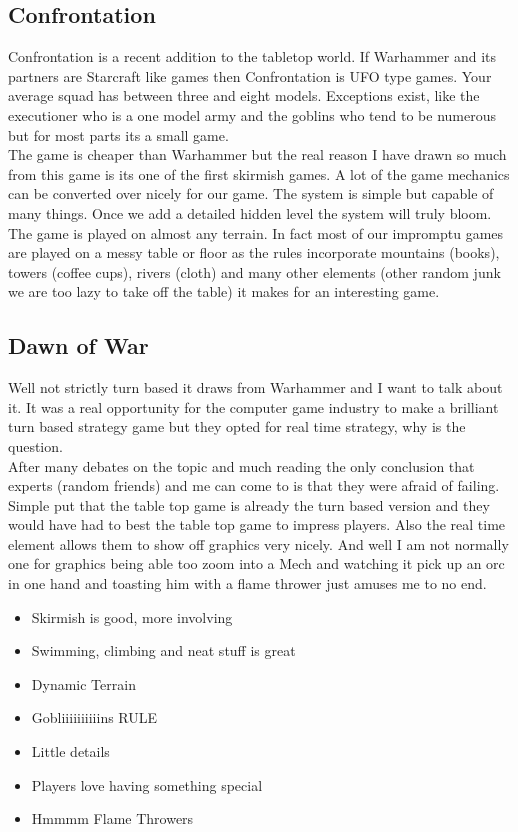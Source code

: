 \documentclass[a4paper]{article}
\begin{document}
\subsection{Confrontation}
Confrontation is a recent addition to the tabletop world. If Warhammer and its partners are Starcraft like games then Confrontation is UFO type games. Your average squad has between three and eight models. Exceptions exist, like the executioner who is a one model army and the goblins who tend to be numerous but for most parts its a small game.\\
The game is cheaper than Warhammer but the real reason I have drawn so much from this game is its one of the first skirmish games. A lot of the game mechanics can be converted over nicely for our game. The system is simple but capable of many things. Once we add a detailed hidden level the system will truly bloom.\\
The game is played on almost any terrain. In fact most of our impromptu games are played on a messy table or floor as the rules incorporate mountains (books), towers (coffee cups), rivers (cloth) and many other elements (other random junk we are too lazy to take off the table) it makes for an interesting game.

\subsection{Dawn of War}
Well not strictly turn based it draws from Warhammer and I want to talk about it. It was a real opportunity for the computer game industry to make a brilliant turn based strategy game but they opted for real time strategy, why is the question.\\
After many debates on the topic and much reading the only conclusion that experts (random friends) and me can come to is that they were afraid of failing. Simple put that the table top game is already the turn based version and they would have had to best the table top game to impress players. Also the real time element allows them to show off graphics very nicely. And well I am not normally one for graphics being able too zoom into a Mech and watching it pick up an orc in one hand and toasting him with a flame thrower just amuses me to no end.\\
\begin{itemize}
\item Skirmish is good, more involving
\item Swimming, climbing and neat stuff is great
\item Dynamic Terrain
\item Gobliiiiiiiiiins RULE
\item Little details
\item Players love having something special
\item Hmmmm Flame Throwers
\end{itemize}
\end{document}
